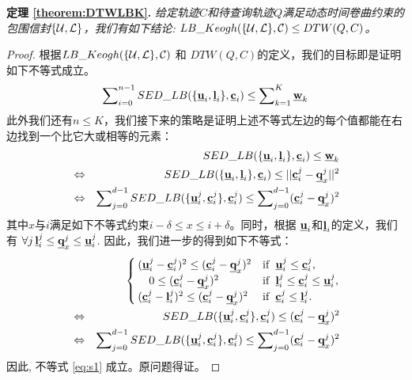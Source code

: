 \textbf{定理 \ref{theorem:DTWLBK}. }{\em 给定轨迹$C$和待查询轨迹$Q$满足动态时间卷曲约束的包围信封$\{{\cal U}, {\cal L}\}$，我们有如下结论: $LB\_Keogh({\{\cal U,\cal L\},{\cal C}}) \le DTW(Q,C)$。}

\begin{proof}
	根据$LB\_Keogh({\{\cal U,\cal L\},{\cal C}})$ 和 $DTW(Q,C)$的定义，我们的目标即是证明如下不等式成立。
\begin{equation}
\sum\nolimits_{i=0}^{n-1}SED\_LB(\{{\emph{{\textbf{u}}}_{i}},\emph{{\textbf{l}}}_{i} \},\emph{{\textbf{c}}}_{i}) \le \sum\nolimits_{k=1}^{K}\emph{{\textbf{w}}}_{k}
\end{equation}	
此外我们还有$n \le K$，我们接下来的策略是证明上述不等式左边的每个值都能在右边找到一个比它大或相等的元素：
\begin{eqnarray}\label{eq:s1}
&&	SED\_LB(\{{\emph{{\textbf{u}}}_{i}},\emph{{\textbf{l}}}_{i} \},\emph{{\textbf{c}}}_{i}) \le \emph{{\textbf{w}}}_{k} \nonumber\\
&\Leftrightarrow& SED\_LB(\{{\emph{{\textbf{u}}}_{i}},\emph{{\textbf{l}}}_{i} \},\emph{{\textbf{c}}}_{i}) \le    || {\emph{{\textbf{c}}}}_{i}^{j} - {\emph{{\textbf{q}}}}_{x}^{j}||^2 \nonumber\\
&\Leftrightarrow& \sum\nolimits_{j=0}^{d-1}SED\_LB(\{ \emph{{\textbf{u}}}_{i}^{j}, {\emph{{\textbf{c}}}}_{i}^{j}\},{\emph{{\textbf{c}}}}_{i}^{j}) \le \sum\nolimits_{j=0}^{d-1}({\emph{{\textbf{c}}}}_{i}^{j} - {\emph{{\textbf{q}}}}_{x}^{j})^2 
\end{eqnarray}
其中$x$与$i$满足如下不等式约束$i-\delta \le x \le i+\delta$。同时，根据 $\emph{{\textbf{u}}}_{i}$和$\emph{{\textbf{l}}}_{i}$的定义，我们有
  $\forall j  \, {\emph{{\textbf{l}}}}_{i}^{j}  \le \emph{{\textbf{q}}}_{x}^{j} \le {\emph{{\textbf{u}}}}_{i}^{j}$.
因此，我们进一步的得到如下不等式：
\begin{eqnarray}
&&\begin{cases}
({\emph{{\textbf{u}}}}_{i}^{j}- {\emph{{\textbf{c}}}}_{i}^{j})^2 \le ({\emph{{\textbf{c}}}}_{i}^{j} - {\emph{{\textbf{q}}}}_{x}^{j})^2 & {\rm if}  \,\,\,    \emph{{\textbf{u}}}_{i}^{j} \le {\emph{{\textbf{c}}}}_{i}^{j},\\
\quad 0 \le ({\emph{{\textbf{c}}}}_{i}^{j} - {\emph{{\textbf{q}}}}_{x}^{j})^2 & {\rm if}  \,\,\,   {\emph{{\textbf{l}}}}_{i}^{j} \le  {\emph{{\textbf{c}}}}_{i}^{j} \le {\emph{{\textbf{u}}}}_{i}^{j},\\
({\emph{{\textbf{c}}}}_{i}^{j} -{\emph{{\textbf{l}}}}_{i}^{j})^2 \le ({\emph{{\textbf{c}}}}_{i}^{j} - {\emph{{\textbf{q}}}}_{x}^{j})^2 & {\rm if}  \,\,\,     {\emph{{\textbf{c}}}}_{i}^{j} \le {\emph{{\textbf{l}}}}_{i}^{j}.
\end{cases} \nonumber \\
&\Leftrightarrow&SED\_LB(\{ \emph{{\textbf{u}}}_{i}^{j}, {\emph{{\textbf{c}}}}_{i}^{j}\},{\emph{{\textbf{c}}}}_{i}^{j}) \le ({\emph{{\textbf{c}}}}_{i}^{j} - {\emph{{\textbf{q}}}}_{x}^{j})^2 \nonumber \\
&\Leftrightarrow& \sum\nolimits_{j=0}^{d-1}SED\_LB(\{ \emph{{\textbf{u}}}_{i}^{j}, {\emph{{\textbf{c}}}}_{i}^{j}\},{\emph{{\textbf{c}}}}_{i}^{j}) \le \sum\nolimits_{j=0}^{d-1}({\emph{{\textbf{c}}}}_{i}^{j} - {\emph{{\textbf{q}}}}_{x}^{j})^2 \nonumber 
\end{eqnarray}
因此, 不等式 \ref{eq:s1} 成立。原问题得证。
\end{proof}

